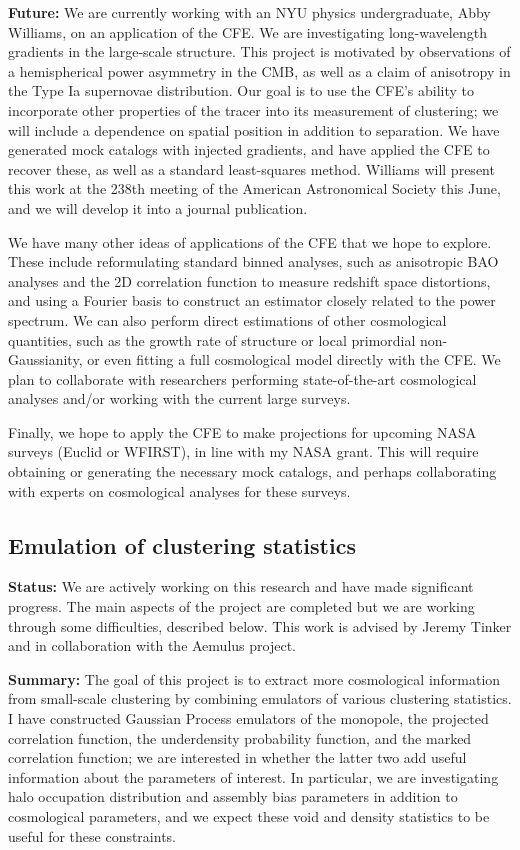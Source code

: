 \documentclass{article}
\begin{document}
\textbf{Future:}
We are currently working with an NYU physics undergraduate, Abby Williams, on an application of the CFE.
We are investigating long-wavelength gradients in the large-scale structure.
This project is motivated by observations of a hemispherical power asymmetry in the CMB, as well as a claim of anisotropy in the Type Ia supernovae distribution.
Our goal is to use the CFE's ability to incorporate other properties of the tracer into its measurement of clustering; we will include a dependence on spatial position in addition to separation.
We have generated mock catalogs with injected gradients, and have applied the CFE to recover these, as well as a standard least-squares method.
Williams will present this work at the 238th meeting of the American Astronomical Society this June, and we will develop it into a journal publication.

We have many other ideas of applications of the CFE that we hope to explore.
These include reformulating standard binned analyses, such as anisotropic BAO analyses and the 2D correlation function to measure redshift space distortions, and using a Fourier basis to construct an estimator closely related to the power spectrum.
We can also perform direct estimations of other cosmological quantities, such as the growth rate of structure or local primordial non-Gaussianity, or even fitting a full cosmological model directly with the CFE.
We plan to collaborate with researchers performing state-of-the-art cosmological analyses and/or working with the current large surveys. 

Finally, we hope to apply the CFE to make projections for upcoming NASA surveys (Euclid or WFIRST), in line with my NASA grant.
This will require obtaining or generating the necessary mock catalogs, and perhaps collaborating with experts on cosmological analyses for these surveys.

\subsection{Emulation of clustering statistics}

\hspace{\parindent} \textbf{Status:}
We are actively working on this research and have made significant progress.
The main aspects of the project are completed but we are working through some difficulties, described below.
This work is advised by Jeremy Tinker and in collaboration with the Aemulus project.

\textbf{Summary:}
The goal of this project is to extract more cosmological information from small-scale clustering by combining emulators of various clustering statistics.
I have constructed Gaussian Process emulators of the monopole, the projected correlation function, the underdensity probability function, and the marked correlation function; we are interested in whether the latter two add useful information about the parameters of interest.
In particular, we are investigating halo occupation distribution and assembly bias parameters in addition to cosmological parameters, and we expect these void and density statistics to be useful for these constraints.
\end{document}
